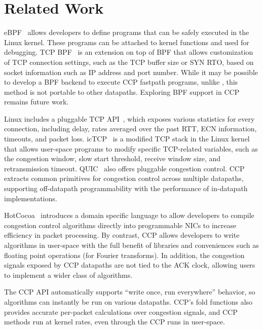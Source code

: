 \section{Related Work}
\label{s:relwork}

eBPF~\cite{ebpf} allows developers to define programs that can be safely executed in the Linux kernel. These programs can be attached to kernel functions and used for debugging. TCP BPF~\cite{tcpbpf} is an extension on top of BPF that allows customization of TCP connection settings, such as the TCP buffer size or SYN RTO, based on socket information such as IP address and port number. While it may be possible to develop a BPF backend to execute CCP fastpath programs, unlike , this method is not portable to other datapaths. Exploring BPF support in CCP remains future work.

Linux includes a pluggable TCP API~\cite{lwn-pluggable-tcp}, which exposes various statistics for every connection, including delay, rates averaged over the past RTT, ECN information, timeouts, and packet loss. 
icTCP~\cite{icTCP} is a modified TCP stack in the Linux kernel that allows user-space programs to modify specific TCP-related variables, such as the congestion window, slow start threshold, receive window size, and retransmission timeout. QUIC~\cite{quic} also offers pluggable congestion control. CCP extracts common primitives for congestion control across multiple datapaths, supporting off-datapath programmability with the performance of in-datapath implementations.

HotCocoa~\cite{hotcocoa} introduces a domain specific language to allow developers to compile congestion control algorithms directly into  programmable NICs to increase efficiency in packet processing. By contrast, CCP allows developers to write algorithms in user-space with the full benefit of libraries and conveniences such as  floating point operations (\eg for Fourier transforms). 
In addition, the congestion signals exposed by CCP datapaths are not tied to the ACK clock, allowing users to implement a wider class of algorithms. 

The CCP API automatically supports ``write once, run everywhere'' behavior, so algorithms can instantly be run on various datapaths. CCP's fold functions also provides accurate per-packet calculations over congestion signals, and CCP methods run at kernel rates, even through the CCP runs in user-space.
\fi

